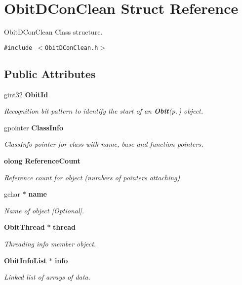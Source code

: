 \section{Obit\-DCon\-Clean Struct Reference}
\label{structObitDConClean}
Obit\-DCon\-Clean Class structure.  


{\tt \#include $<$Obit\-DCon\-Clean.h$>$}

\subsection*{Public Attributes}
\begin{CompactItemize}
\item 
gint32 {\bf Obit\-Id}
\begin{CompactList}\small\item\em Recognition bit pattern to identify the start of an {\bf Obit}{\rm (p.\,\pageref{structObit})} object. \item\end{CompactList}\item 
gpointer {\bf Class\-Info}
\begin{CompactList}\small\item\em Class\-Info pointer for class with name, base and function pointers. \item\end{CompactList}\item 
{\bf olong} {\bf Reference\-Count}
\begin{CompactList}\small\item\em Reference count for object (numbers of pointers attaching). \item\end{CompactList}\item 
gchar $\ast$ {\bf name}
\begin{CompactList}\small\item\em Name of object [Optional]. \item\end{CompactList}\item 
{\bf Obit\-Thread} $\ast$ {\bf thread}
\begin{CompactList}\small\item\em Threading info member object. \item\end{CompactList}\item 
{\bf Obit\-Info\-List} $\ast$ {\bf info}
\begin{CompactList}\small\item\em Linked list of arrays of data. \item\end{CompactList}\item 

\end{CompactItemize}
